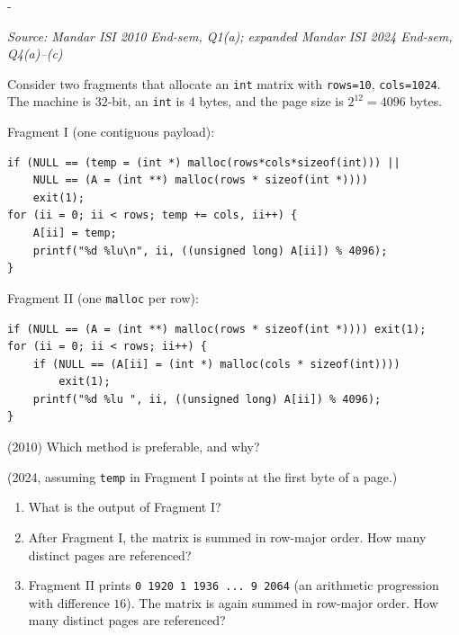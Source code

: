 \documentclass[11pt,a4paper]{article}
\makeatletter
\newcommand{\keepspace}[1]{\par\penalty-100\begingroup
  \setlength{\dimen@}{#1}\dimen@ii\pagegoal\advance\dimen@ii-\pagetotal
  \ifdim\dimen@>\dimen@ii\ifdim\dimen@ii>\z@\vfil\fi\break\fi\endgroup}
\newcounter{qn}[section]
\newenvironment{Qn}[4]{%
  \refstepcounter{qn}\keepspace{7\baselineskip}%
  \begin{tcolorbox}[qboxstyle, title={Q\thesection.\theqn\ \ [#1 \textbar\ #2]\ \ #4}]%
  {\footnotesize\color{g3}\textit{Source: #3}}\par\smallskip%
}{%
  \end{tcolorbox}%
}
\makeatother
\begin{document}
\begin{Qn}{Medium}{Lect 11}{Mandar ISI 2010 End-sem, Q1(a); expanded Mandar ISI 2024 End-sem, Q4(a)--(c)}{Two ways to \texttt{malloc} a 2-D array, and how many pages they touch}
Consider two fragments that allocate an \texttt{int} matrix with
\texttt{rows=10}, \texttt{cols=1024}. The machine is $32$-bit, an
\texttt{int} is $4$ bytes, and the page size is $2^{12}=4096$ bytes.

Fragment I (one contiguous payload):
\begin{lstlisting}[numbers=none]
if (NULL == (temp = (int *) malloc(rows*cols*sizeof(int))) ||
    NULL == (A = (int **) malloc(rows * sizeof(int *))))
    exit(1);
for (ii = 0; ii < rows; temp += cols, ii++) {
    A[ii] = temp;
    printf("%d %lu\n", ii, ((unsigned long) A[ii]) % 4096);
}
\end{lstlisting}

Fragment II (one \texttt{malloc} per row):
\begin{lstlisting}[numbers=none]
if (NULL == (A = (int **) malloc(rows * sizeof(int *)))) exit(1);
for (ii = 0; ii < rows; ii++) {
    if (NULL == (A[ii] = (int *) malloc(cols * sizeof(int))))
        exit(1);
    printf("%d %lu ", ii, ((unsigned long) A[ii]) % 4096);
}
\end{lstlisting}

(2010) Which method is preferable, and why?

(2024, assuming \texttt{temp} in Fragment I points at the first byte
of a page.)
\begin{enumerate}
  \item[(a)] What is the output of Fragment I?
  \item[(b)] After Fragment I, the matrix is summed in row-major
        order. How many distinct pages are referenced?
  \item[(c)] Fragment II prints
        \texttt{0 1920  1 1936  ...  9 2064}
        (an arithmetic progression with difference $16$). The matrix
        is again summed in row-major order. How many distinct pages
        are referenced?
\end{enumerate}
\end{Qn}
\end{document}
